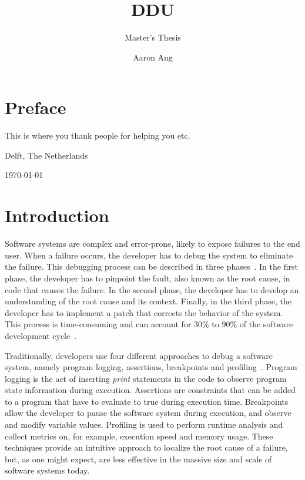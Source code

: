 \documentclass[twoside,a4paper,11pt]{memoir}
\title{DDU}
\subtitle{Master's Thesis}
\author{Aaron Ang}
\begin{document}
\frontmatter
\thispagestyle{empty}
\maketitle
{}

\chapter{Preface}%
\label{ch:preface}

This is where you thank people for helping you etc.

\vspace{1cm}
\begin{flushright}
\theauthor%

Delft, The Netherlands

\today%
\end{flushright}

\cleardoublepage\tableofcontents
\cleardoublepage\listoffigures
\cleardoublepage\mainmatter%

\chapter{Introduction}%
\label{ch:introduction}
Software systems are complex and error-prone, likely to expose failures to the end user.
When a failure occurs, the developer has to debug the system to eliminate the failure.
This debugging process can be described in three phases~\cite{Parnin:2011:ADT:2001420.2001445}.
In the first phase, the developer has to pinpoint the fault, also known as the root cause, in code that causes the failure.
In the second phase, the developer has to develop an understanding of the root cause and its context.
Finally, in the third phase, the developer has to implement a patch that corrects the behavior of the system.
This process is time-consuming and can account for 30\% to 90\% of the software development cycle~\cite{robbins2003debugging, beizer2003software, britton2013reversible}.

Traditionally, developers use four different approaches to debug a software system, namely program logging, assertions, breakpoints and profiling~\cite{wong2016survey}.
Program logging is the act of inserting \emph{print} statements in the code to observe program state information during execution.
Assertions are constraints that can be added to a program that have to evaluate to true during execution time.
Breakpoints allow the developer to pause the software system during execution, and observe and modify variable values.
Profiling is used to perform runtime analysis and collect metrics on, for example, execution speed and memory usage.
These techniques provide an intuitive approach to localize the root cause of a failure, but, as one might expect, are less effective in the massive size and scale of software systems today.
\end{document}
